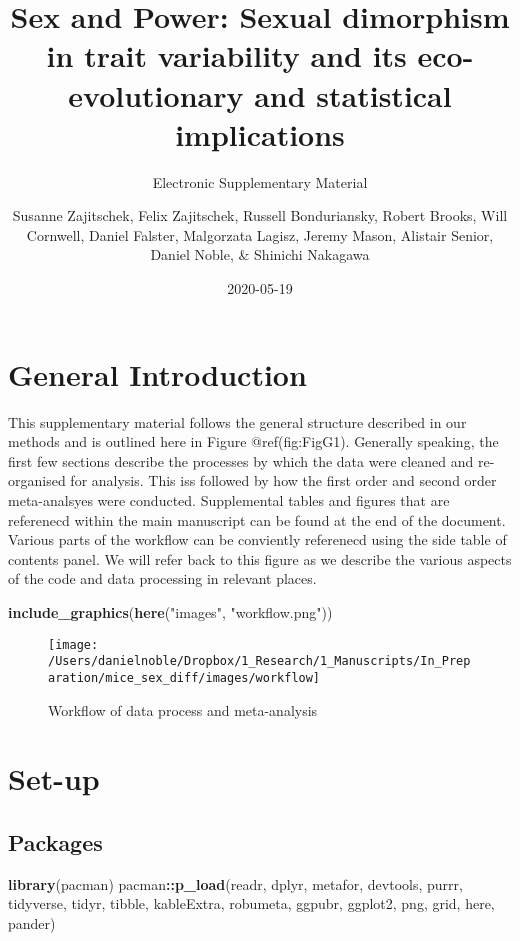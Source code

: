 \documentclass[]{article}
\title{Sex and Power: Sexual dimorphism in trait variability and its
eco-evolutionary and statistical implications}
\subtitle{Electronic Supplementary Material}
\author{Susanne Zajitschek, Felix Zajitschek, Russell Bonduriansky, Robert
Brooks, Will Cornwell, Daniel Falster, Malgorzata Lagisz, Jeremy Mason,
Alistair Senior, Daniel Noble, \& Shinichi Nakagawa}
\date{2020-05-19}
\newenvironment{Shaded}{\begin{snugshade}}{\end{snugshade}}
\newcommand{\KeywordTok}[1]{\textcolor[rgb]{0.13,0.29,0.53}{\textbf{#1}}}
\newcommand{\NormalTok}[1]{#1}
\newcommand{\OperatorTok}[1]{\textcolor[rgb]{0.81,0.36,0.00}{\textbf{#1}}}
\newcommand{\StringTok}[1]{\textcolor[rgb]{0.31,0.60,0.02}{#1}}
\begin{document}
\maketitle

{
\setcounter{tocdepth}{4}
\tableofcontents
}
\hypertarget{general-introduction}{%
\section{General Introduction}\label{general-introduction}}

This supplementary material follows the general structure described in
our methods and is outlined here in Figure @ref(fig:FigG1). Generally
speaking, the first few sections describe the processes by which the
data were cleaned and re-organised for analysis. This iss followed by
how the first order and second order meta-analsyes were conducted.
Supplemental tables and figures that are referenecd within the main
manuscript can be found at the end of the document. Various parts of the
workflow can be conviently referenecd using the side table of contents
panel. We will refer back to this figure as we describe the various
aspects of the code and data processing in relevant places.

\begin{Shaded}
\begin{Highlighting}[]
\KeywordTok{include_graphics}\NormalTok{(}\KeywordTok{here}\NormalTok{(}\StringTok{"images"}\NormalTok{, }\StringTok{"workflow.png"}\NormalTok{))}
\end{Highlighting}
\end{Shaded}

\begin{figure}
\texttt{[image: /Users/danielnoble/Dropbox/1\_Research/1\_Manuscripts/In\_Preparation/mice\_sex\_diff/images/workflow]} \caption{Workflow of data process and meta-analysis}\label{fig:FigG1}
\end{figure}

\hypertarget{set-up}{%
\section{Set-up}\label{set-up}}

\hypertarget{packages}{%
\subsection{Packages}\label{packages}}

\begin{Shaded}
\begin{Highlighting}[]
\KeywordTok{library}\NormalTok{(pacman)}
\NormalTok{pacman}\OperatorTok{::}\KeywordTok{p_load}\NormalTok{(readr, dplyr, metafor, devtools, purrr, tidyverse, tidyr, tibble, }
\NormalTok{    kableExtra, robumeta, ggpubr, ggplot2, png, grid, here, pander)}
\end{Highlighting}
\end{Shaded}
\end{document}
